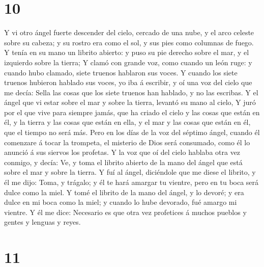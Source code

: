 \hypertarget{section-9}{%
\section{10}\label{section-9}}

 Y vi otro ángel fuerte descender del cielo, cercado de una
nube, y el arco celeste sobre su cabeza; y su rostro era como el sol, y
sus pies como columnas de fuego.  Y tenía en su mano un
librito abierto: y puso su pie derecho sobre el mar, y el izquierdo
sobre la tierra;  Y clamó con grande voz, como cuando un
león ruge: y cuando hubo clamado, siete truenos hablaron sus voces.
 Y cuando los siete truenos hubieron hablado sus voces, yo
iba á escribir, y oí una voz del cielo que me decía: Sella las cosas que
los siete truenos han hablado, y no las escribas.  Y el
ángel que vi estar sobre el mar y sobre la tierra, levantó su mano al
cielo,  Y juró por el que vive para siempre jamás, que ha
criado el cielo y las cosas que están en él, y la tierra y las cosas que
están en ella, y el mar y las cosas que están en él, que el tiempo no
será más.  Pero en los días de la voz del séptimo ángel,
cuando él comenzare á tocar la trompeta, el misterio de Dios será
consumado, como él lo anunció á sus siervos los profetas.  Y
la voz que oí del cielo hablaba otra vez conmigo, y decía: Ve, y toma el
librito abierto de la mano del ángel que está sobre el mar y sobre la
tierra.  Y fuí al ángel, diciéndole que me diese el librito,
y él me dijo: Toma, y trágalo; y él te hará amargar tu vientre, pero en
tu boca será dulce como la miel.  Y tomé el librito de la
mano del ángel, y lo devoré; y era dulce en mi boca como la miel; y
cuando lo hube devorado, fué amargo mi vientre.  Y él me
dice: Necesario es que otra vez profetices á muchos pueblos y gentes y
lenguas y reyes.

\hypertarget{section-10}{%
\section{11}\label{section-10}}

